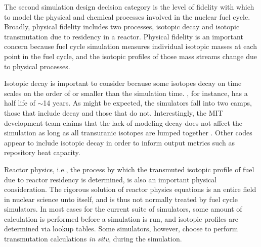 The second simulation design decision category is the level of fidelity with
which to model the physical and chemical processes involved in the nuclear fuel
cycle. Broadly, physical fidelity includes two processes, isotopic decay and
isotopic transmutation due to residency in a reactor. Physical fidelity is an
important concern because fuel cycle simulation measures individual isotopic
masses at each point in the fuel cycle, and the isotopic profiles of those mass
streams change due to physical processes. 

Isotopic decay is important to consider because some isotopes decay on time
scales on the order of or smaller than the simulation time. , for
instance, has a half life of $\sim$14 years. As might be expected, the
simulators fall into two camps, those that include decay and those that do
not. Interestingly, the MIT development team claims that the lack of modeling
decay does not affect the simulation as long as all transuranic isotopes are
lumped together \cite{guerin_impact_2009}. Other codes appear to include
isotopic decay in order to inform output metrics such as repository heat
capacity. 

Reactor physics, i.e., the process by which the transmuted isotopic profile of
fuel due to reactor residency is determined, is also an important physical
consideration. The rigorous solution of reactor physics equations is an entire
field in nuclear science unto itself, and is thus not normally treated by fuel
cycle simulators. In most cases for the current suite of simulators, some amount
of calculation is performed before a simulation is run, and isotopic profiles
are determined via lookup tables. Some simulators, however, choose to perform
transmutation calculations \textit{in situ}, during the simulation.

